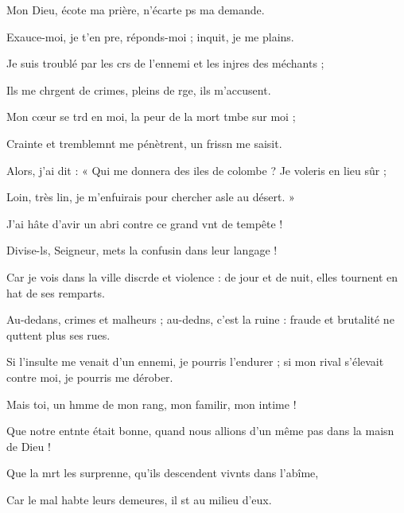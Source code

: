 \item Mon Dieu, écote ma prière,\psstar{} n’écarte ps ma demande.
\item Exauce-moi, je t’en pre, réponds-moi ;\psstar{} inquit, je me plains.
\item Je suis troublé par les crs de l’ennemi\psstar{} et les injres des méchants ;
\item Ils me chrgent de crimes,\psstar{} pleins de rge, ils m’accusent.
\item Mon cœur se trd en moi,\psstar{} la peur de la mort tmbe sur moi ;
\item Crainte et tremblemnt me pénètrent,\psstar{} un frissn me saisit.
\item Alors, j’ai dit : « Qui me donnera des iles de colombe ?\psstar{} Je voleris en lieu sûr ;
\item Loin, très lin, je m’enfuirais\psstar{} pour chercher asle au désert. »
\item J’ai hâte d’avir un abri\psstar{} contre ce grand vnt de tempête !
\item Divise-ls, Seigneur,\psstar{} mets la confusin dans leur langage ! 
\item Car je vois dans la ville discrde et violence :\psstar{} de jour et de nuit, elles tournent en hat de ses remparts.
\item Au-dedans, crimes et malheurs ; au-dedns, c’est la ruine :\psstar{} fraude et brutalité ne quttent plus ses rues.
\item Si l’insulte me venait d’un ennemi, je pourris l’endurer ;\psstar{} si mon rival s’élevait contre moi, je pourris me dérober.
\item Mais toi, un hmme de mon rang,\psstar{} mon familir, mon intime !
\item Que notre entnte était bonne,\psstar{} quand nous allions d’un même pas dans la maisn de Dieu !
\item Que la mrt les surprenne,\psstar{} qu’ils descendent vivnts dans l’abîme, 
\item Car le mal habte leurs demeures,\psstar{} il st au milieu d’eux.